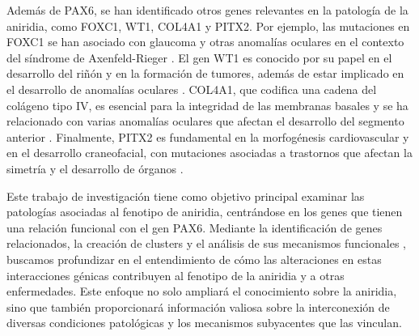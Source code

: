 Además de PAX6, se han identificado otros genes relevantes en la patología de la aniridia, como FOXC1, WT1, COL4A1 y PITX2. Por ejemplo, las mutaciones en FOXC1 se han asociado con glaucoma y otras anomalías oculares en el contexto del síndrome de Axenfeld-Rieger \cite{Reis2023}. El gen WT1 es conocido por su papel en el desarrollo del riñón y en la formación de tumores, además de estar implicado en el desarrollo de anomalías oculares \cite{Pelletier1991}. COL4A1, que codifica una cadena del colágeno tipo IV, es esencial para la integridad de las membranas basales y se ha relacionado con varias anomalías oculares que afectan el desarrollo del segmento anterior \cite{Vahedi2011}. Finalmente, PITX2 es fundamental en la morfogénesis cardiovascular y en el desarrollo craneofacial, con mutaciones asociadas a trastornos que afectan la simetría y el desarrollo de órganos \cite{French2021}.

Este trabajo de investigación tiene como objetivo principal examinar las patologías asociadas al fenotipo de aniridia, centrándose en los genes que tienen una relación funcional con el gen PAX6. Mediante la identificación de genes relacionados, la creación de clusters \cite{ben1999clustering} y el análisis de sus mecanismos funcionales \cite{FloresCamacho2009}, buscamos profundizar en el entendimiento de cómo las alteraciones en estas interacciones génicas contribuyen al fenotipo de la aniridia y a otras enfermedades. Este enfoque no solo ampliará el conocimiento sobre la aniridia, sino que también proporcionará información valiosa sobre la interconexión de diversas condiciones patológicas y los mecanismos subyacentes que las vinculan.